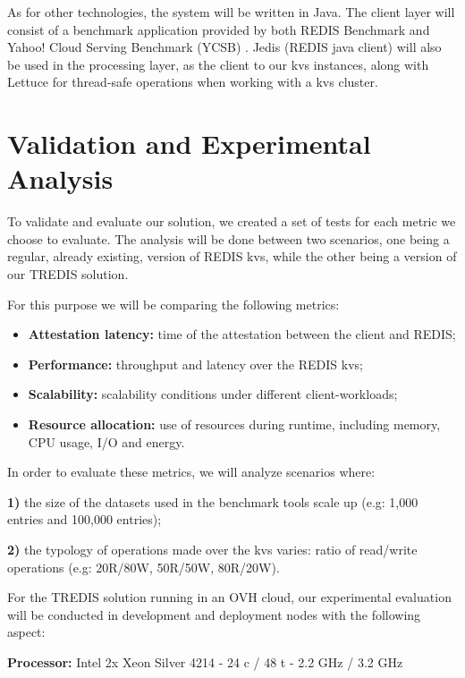 As for other technologies, the system will be written in Java. 
The client layer will consist of a benchmark application provided by both REDIS Benchmark and Yahoo! Cloud Serving Benchmark (YCSB) \cite{ycsb}. 
Jedis (REDIS java client) \cite{jedis} will also be used in the processing layer, as the client to our \gls{kvs} instances, along with Lettuce \cite{lettuce} for thread-safe operations when working with a \gls{kvs} cluster.


\section{Validation and Experimental Analysis} %
\label{sec:floats_figures_and_captions}

To validate and evaluate our solution, we created a set of tests for each metric we choose to evaluate. The analysis will be done between two scenarios, one being a regular, already existing, version of REDIS \gls{kvs}, while the other being a version of our TREDIS solution.

For this purpose we will be comparing the following metrics:

\begin{itemize}
	\item \textbf{Attestation latency:} time of the attestation between the client and REDIS;
	\item \textbf{Performance:} throughput and latency over the REDIS \gls{kvs};
	\item \textbf{Scalability:} scalability conditions under different client-workloads;
	\item \textbf{Resource allocation:} use of resources during runtime, including memory, CPU usage, I/O and energy.
\end{itemize}

In order to evaluate these metrics, we will analyze scenarios where:

\textbf{1)} the size of the datasets used in the benchmark tools scale up (e.g: 1,000 entries and 100,000 entries);

\textbf{2)} the typology of operations made over the \gls{kvs} varies: ratio of read/write operations (e.g: 20R/80W, 50R/50W, 80R/20W).


For the TREDIS solution running in an OVH cloud, our experimental evaluation will be conducted in development and deployment nodes with the following aspect:

\textbf{Processor:} Intel 2x Xeon Silver 4214 - 24 c / 48 t - 2.2 GHz / 3.2 GHz

